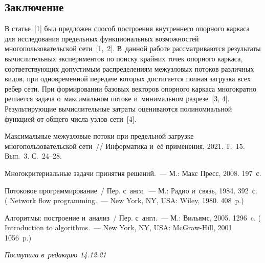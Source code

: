 \begin{multicols}{2}
\section{Заключение}

В статье~[1] был предложен способ по\-стро\-ения внут\-рен\-не\-го опор\-но\-го
кар\-ка\-са  для   исследования  предельных функциональных
возможностей многопользовательской  сети~[1,~2]. В~данной работе
рас\-смат\-ри\-ва\-ют\-ся результаты вы\-чис\-ли\-тель\-ных экспериментов по  поиску
край\-них точек опорного кар\-ка\-са, соответствующих до\-пус\-ти\-мым
распределениям межузловых   потоков различных видов,  при
одновременной передаче которых достигается пол\-ная загрузка всех
ребер  сети.    При  формировании   базовых  век\-то\-ров  опорного
каркаса  многократно решается задача  о~максимальном потоке  
и~минимальном раз\-ре\-зе~[3, 4]. Ре\-зуль\-ти\-ру\-ющие вы\-чис\-ли\-тель\-ные за\-тра\-ты
оцениваются полиномиальной функцией от  общего  чис\-ла узлов
сети~[4].


{\small\frenchspacing
 {%
 \begin{thebibliography}{9}

   Максимальные   межузловые потоки
при предельной за\-груз\-ке  многопользовательской сети~//  Информатика и~её применения, 
2021. Т.~15. Вып.~3.  С.~24--28.

 Многокритериальные задачи
принятия решений.~--- М.: Макс Пресс, 2008. 197~с.

 Потоковое программирование~/ Пер.
с~англ.~--- М.: Радио и~связь, 1984. 392~с. ( Network flow programming.~--- New York, NY, USA:
Wiley, 1980. 408~p.)


Алгоритмы: по\-стро\-ение и~анализ~/ Пер. с~англ.~--- М.: Вильямс,
2005. 1296~c. ( Introduction to algorithms.~--- New York,
NY, USA: McGraw-Hill, 2001.  1056~p.)
\end{thebibliography}

 }
 }

\end{multicols}

\vspace*{-9pt}

\hfill{\small\textit{Поступила в~редакцию 14.12.21}}

